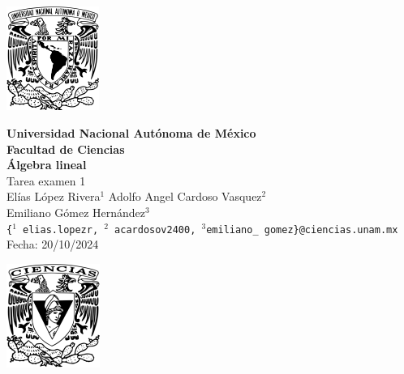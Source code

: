 \documentclass[11pt,letterpaper]{article}
\begin{document}
\makeatletter
        \renewenvironment{proof}[1][\proofname]{\par
            \pushQED{\qed}%
            \normalfont \topsep6\p@\@plus6\p@\relax
            \trivlist
            \item\relax
            {\itshape
            #1\@addpunct{.}}\par\vspace{\baselineskip}\ignorespaces
            }{%
            \popQED\endtrivlist\@endpefalse
            }
\makeatother

\begin{center}
    \begin{minipage}{3cm}
    	\begin{center}
    		\includegraphics[height=3.4cm]{logo_unam.png}
    	\end{center}
    \end{minipage}\hfill
    \begin{minipage}{10cm}
    	\begin{center}
    	\textbf{\large Universidad Nacional Autónoma de México}\\[0.1cm]
        \textbf{Facultad de Ciencias}\\[0.1cm]
        \textbf{\'Algebra lineal}\\[0.1cm]
        Tarea examen 1 \\[0.1cm]
         El\'ias L\'opez Rivera$^{1}$\,\,Adolfo Angel Cardoso Vasquez$^{2}$\\[0.1cm]
		Emiliano G\'omez Hern\'andez$^{3}$\\[0.1cm]
        \texttt{\{$^{1}$ elias.lopezr,\,${^2}$ acardosov2400,\,$^{3}$emiliano\_ gomez\}@ciencias.unam.mx }\\[0.1cm]
        Fecha:\,\,20/10/2024
    	\end{center}
    \end{minipage}\hfill
    \begin{minipage}{3cm}
    	\begin{center}
    		\includegraphics[height=3.4cm]{Logo_FC.png}
    	\end{center}
    \end{minipage}
\end{center}
\end{document}
